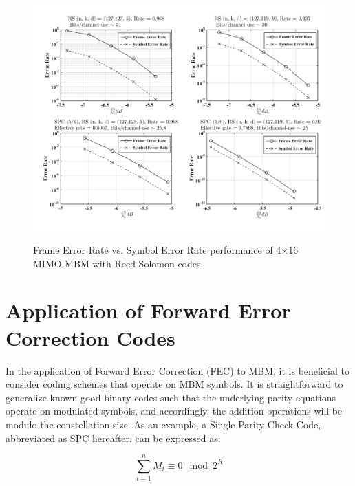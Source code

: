 \begin{figure}[t]
\centering
\vspace{-1cm}

{\includegraphics[scale = 0.55,  trim = 0cm 0cm 0cm 0cm]{./fig/ser_vs_fer_RS}}
\caption{ Frame Error Rate vs. Symbol Error Rate performance of 4$\times$16 MIMO-MBM with Reed-Solomon codes.}

\label{ser_vs_fer}
\end{figure}

\section{Application of Forward Error Correction Codes}


In the application of Forward Error Correction (FEC) to MBM, it is beneficial to consider coding schemes that operate on MBM symbols. It is straightforward to generalize known good binary codes such that the underlying parity equations operate on modulated symbols, and accordingly, the addition operations will be modulo the constellation size. As an example, a Single Parity Check Code, abbreviated as SPC hereafter, can be expressed as:


\begin{equation}
\sum_{i = 1}^{n}  M_i   \equiv 0 \mod 2^R
\end{equation}


